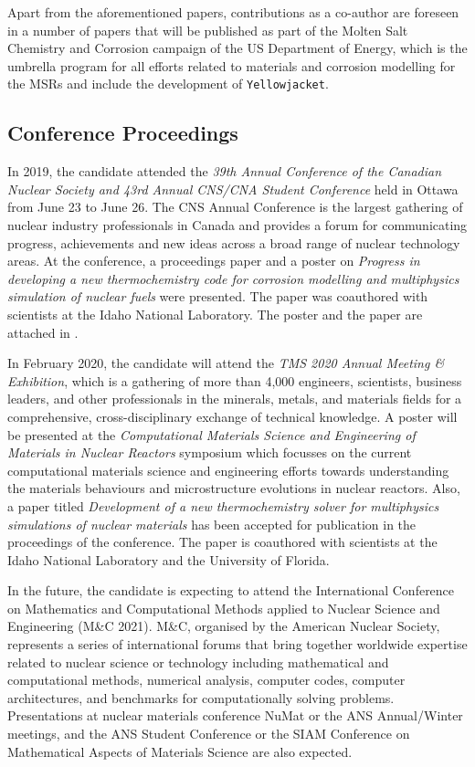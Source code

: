 	Apart from the aforementioned papers, contributions as a co-author are foreseen in a number of papers that will be published as part of the Molten Salt Chemistry and Corrosion campaign of the US Department of Energy, which is the umbrella program for all efforts related to materials and corrosion  modelling for the MSRs and include the development of \texttt{Yellowjacket}.

	\subsection{Conference Proceedings}
	In 2019, the candidate attended the \emph{39th Annual Conference of the Canadian Nuclear Society and 43rd Annual CNS/CNA Student Conference} held in Ottawa from June 23 to June 26. The CNS Annual Conference is the largest gathering of nuclear industry professionals in Canada and provides a forum for communicating progress, achievements and new ideas across a broad range of nuclear technology areas. At the conference, a proceedings paper and a poster on \emph{Progress in developing a new thermochemistry code for corrosion modelling and multiphysics simulation of nuclear fuels} were presented. The paper was coauthored with scientists at the Idaho National Laboratory. The poster and the paper are attached in .

	In February 2020, the candidate will attend the \emph{TMS 2020 Annual Meeting \& Exhibition}, which is a gathering of more than 4,000 engineers, scientists, business leaders, and other professionals in the minerals, metals, and materials fields for a comprehensive, cross-disciplinary exchange of technical knowledge. A poster will be presented at the \emph{Computational Materials Science and Engineering of Materials in Nuclear Reactors} symposium which focusses on the current computational materials science and engineering efforts towards understanding the materials behaviours and microstructure evolutions in nuclear reactors. Also, a paper titled \emph{Development of a new thermochemistry solver for multiphysics simulations of nuclear materials} has been accepted for publication in the proceedings of the conference. The paper is coauthored with scientists at the Idaho National Laboratory and the University of Florida.


	In the future, the candidate is expecting to attend the International Conference on Mathematics and Computational Methods applied to Nuclear Science and Engineering (M\&C 2021). M\&C, organised by the American Nuclear Society, represents a series of international forums that bring together worldwide expertise related to nuclear science or technology including mathematical and computational methods, numerical analysis, computer codes, computer architectures, and benchmarks for computationally solving problems. Presentations at nuclear materials conference NuMat or the ANS Annual/Winter meetings, and the ANS Student Conference or the SIAM Conference on Mathematical Aspects of Materials Science are also expected.


